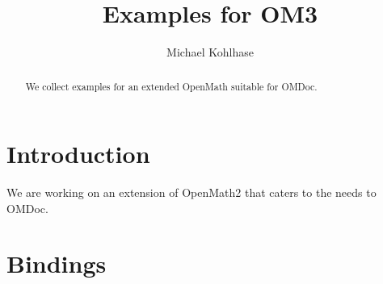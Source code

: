 \documentclass[12pt]{article}
\title{Examples for OM3}
\author{Michael Kohlhase}
\begin{document}
\maketitle
\begin{abstract}
  We collect examples for an extended OpenMath suitable for OMDoc.
\end{abstract}

\section{Introduction}
We are working on an extension of OpenMath2 that caters to the needs to OMDoc. 

\section{Bindings}


 

\end{document}
